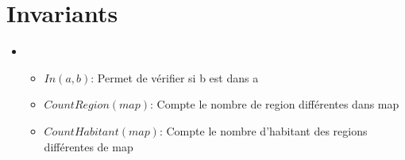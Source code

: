 \section{Invariants}\label{invariants}

\begin{itemize}

\item[]
\begin{itemize}
    \item[]$In(a, b)$: Permet de vérifier si b est dans a
        \indent
    \item[]$CountRegion(map)$: Compte le nombre de region différentes dans map
        \indent
    \item[]$CountHabitant(map)$: Compte le nombre d'habitant des regions différentes de map
        \indent
\end{itemize}

\end{itemize}

